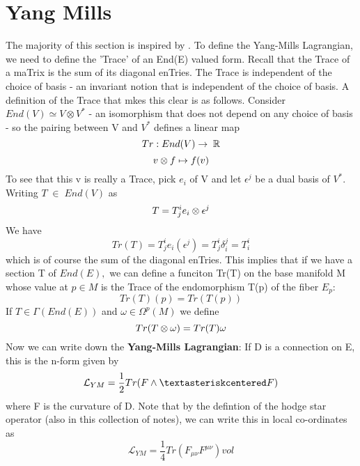 \section{Yang Mills}
The majority of this section is inspired by \cite{john1994gauge}.
    To define the Yang-Mills Lagrangian, we need to define the 'Trace' of an End(E) valued form. Recall that the Trace
of a maTrix is the sum of its diagonal enTries. 
   The Trace is independent of the choice of basis - an invariant notion that is independent of the choice of basis. 
A definition of the Trace that mkes this clear is as follows. Consider $End(V) \simeq V \otimes V^*$ - an isomorphism that 
does not depend on any choice of basis - so the pairing between V and $V^*$ defines a linear map
\begin{equation*}
 Tr: End(V) \rightarrow \; \mathbb{R} \end{equation*} \begin{equation*}
   v \otimes f \mapsto f(v)
\end{equation*}
To see that this v is really a Trace, pick $e_i$ of V and let $\epsilon^j$ be a dual basis of $V^*$.
 Writing $T \;\in\; End(V)$ as 
\begin{equation*}
 T = T^i_j e_i \otimes \epsilon^j
\end{equation*}
We have 
\begin{equation*}
 Tr(T) = T^i_je_i(\epsilon^j) = T^i_j \delta_i^j = T^i_i
\end{equation*}
which is of course the sum of the diagonal enTries.
  \newline This implies that if we have a section T of $End(E),$ we can define a funciton Tr(T) on the base manifold M
whose value at $p \in M$ is the Trace of the endomorphism T(p) of the fiber $E_p$:
\begin{equation*}
 Tr(T)(p) = Tr(T(p))
\end{equation*}
If $T \in \Gamma(End(E))$ and $\omega \in \Omega^p(M)$ we define 
$$Tr(T \otimes \omega) = Tr(T)\omega$$
Now we can write down the \textbf{Yang-Mills Lagrangian}: If D is a connection on E, this is the n-form given by 
\begin{equation}
 \mathcal{L}_{YM} = \frac{1}{2} Tr(F \wedge \textasteriskcentered F)
\end{equation}
where F is the curvature of D.
Note that by the defintion of the hodge star operator (also in this collection of notes), we can write this 
in local co-ordinates as 
\begin{equation}
 \mathcal{L}_{YM} = \frac{1}{4} Tr (F_{\mu \nu}F^{\mu \nu})vol
\end{equation}
